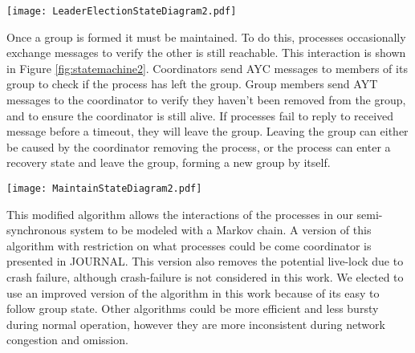 \begin{figure*}[!t]
\texttt{[image: LeaderElectionStateDiagram2.pdf]}
\caption{State machine of a leader election. Processes start as coordinators in the ``Normal'' state and search for other coordinators to join with. Processes immediately respond to \ac{AYC} messages they receive. The algorithm was modified by adding a ``Ready Acknowledgment'' message as the final step of completing the election. Additionally, processes only accept invites if they have received an ``\ac{AYC} Response'' message from the inviting process.}
\label{fig:statemachine}
\end{figure*}

Once a group is formed it must be maintained.
To do this, processes occasionally exchange messages to verify the other is still reachable.
This interaction is shown in Figure \ref{fig:statemachine2}.
Coordinators send \ac{AYC} messages to members of its group to check if the process has left the group.
Group members send \ac{AYT} messages to the coordinator to verify they haven't been removed from the group, and to ensure the coordinator is still alive.
If processes fail to reply to received message before a timeout, they will leave the group.
Leaving the group can either be caused by the coordinator removing the process, or the process can enter a recovery state and leave the group, forming a new group by itself.

\begin{figure*}[!t]
\texttt{[image: MaintainStateDiagram2.pdf]}
\caption{State machine of maintaining a group. The \ac{AYC} messages are the same as those in Figure \ref{fig:statemachine}. \ac{AYC} and \ac{AYT} are periodically sent by processes, and responses to those messages are immediately sent by the receiving process. In the modified algorithm, the member does not enter the recovery state if they do not receive an \ac{AYT} response before the timeout expires.}
\label{fig:statemachine2}
\end{figure*}

This modified algorithm allows the interactions of the processes in our semi-synchronous system to be modeled with a Markov chain.
A version of this algorithm with restriction on what processes could be come coordinator is presented in JOURNAL.
This version also removes the potential live-lock due to crash failure, although crash-failure is not considered in this work.
We elected to use an improved version of the algorithm in this work because of its easy to follow group state.
Other algorithms could be more efficient and less bursty during normal operation, however they are more inconsistent during network congestion and omission.

